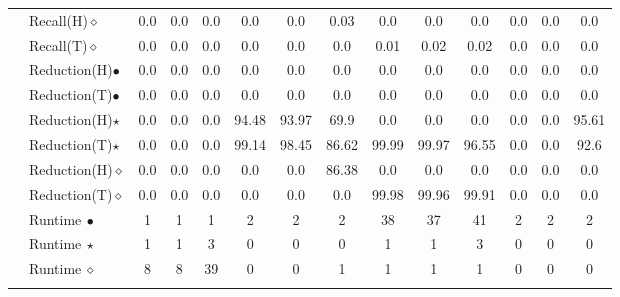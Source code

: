 \begin{tabular}{p{0.3em} p{6em} || ccc | ccc | ccc | ccc}
\cline{2-14}
& Recall(H)$\diamond$ & 0.0 & 0.0 & 0.0 & 0.0 & 0.0 & 0.03 & 0.0 & 0.0 & 0.0 & 0.0 & 0.0 & 0.0 \\
\cline{2-14}
& Recall(T)$\diamond$ & 0.0 & 0.0 & 0.0 & 0.0 & 0.0 & 0.0 & 0.01 & 0.02 & 0.02 & 0.0 & 0.0 & 0.0 \\
\cline{2-14}
& Reduction(H)$\bullet$ & 0.0 & 0.0 & 0.0 & 0.0 & 0.0 & 0.0 & 0.0 & 0.0 & 0.0 & 0.0 & 0.0 & 0.0 \\
\cline{2-14}
& Reduction(T)$\bullet$ & 0.0 & 0.0 & 0.0 & 0.0 & 0.0 & 0.0 & 0.0 & 0.0 & 0.0 & 0.0 & 0.0 & 0.0 \\
\cline{2-14}
& Reduction(H)$\star$ & 0.0 & 0.0 & 0.0 & 94.48 & 93.97 & 69.9 & 0.0 & 0.0 & 0.0 & 0.0 & 0.0 & 95.61 \\
\cline{2-14}
& Reduction(T)$\star$ & 0.0 & 0.0 & 0.0 & 99.14 & 98.45 & 86.62 & 99.99 & 99.97 & 96.55 & 0.0 & 0.0 & 92.6 \\
\cline{2-14}
& Reduction(H)$\diamond$ & 0.0 & 0.0 & 0.0 & 0.0 & 0.0 & 86.38 & 0.0 & 0.0 & 0.0 & 0.0 & 0.0 & 0.0 \\
\cline{2-14}
& Reduction(T)$\diamond$ & 0.0 & 0.0 & 0.0 & 0.0 & 0.0 & 0.0 & 99.98 & 99.96 & 99.91 & 0.0 & 0.0 & 0.0 \\
\cline{2-14}
& Runtime$\ \bullet$ & 1 & 1 & 1 & 2 & 2 & 2 & 38 & 37 & 41 & 2 & 2 & 2 \\
\cline{2-14}
& Runtime$\ \star$ & 1 & 1 & 3 & 0 & 0 & 0 & 1 & 1 & 3 & 0 & 0 & 0 \\
\cline{2-14}
& Runtime$\ \diamond$ & 8 & 8 & 39 & 0 & 0 & 1 & 1 & 1 & 1 & 0 & 0 & 0 \\
\cline{2-14}
\\[-5pt]\end{tabular}
\endgroup
